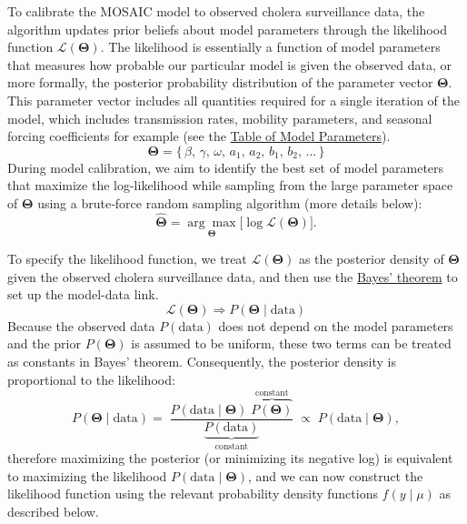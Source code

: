 \documentclass[
]{book}
\begin{document}
To calibrate the MOSAIC model to observed cholera surveillance data, the algorithm updates prior beliefs about model parameters through the likelihood function \(\mathcal{L}(\boldsymbol{\Theta})\). The likelihood is essentially a function of model parameters that measures how probable our particular model is given the observed data, or more formally, the posterior probability distribution of the parameter vector \(\boldsymbol{\Theta}\). This parameter vector includes all quantities required for a single iteration of the model, which includes transmission rates, mobility parameters, and seasonal forcing coefficients for example (see the \href{https://www.mosaicmod.org/model-description.html\#table-of-model-parameters}{Table of Model Parameters}).
\begin{equation}
\boldsymbol{\Theta} = \{\, \beta,\, \gamma,\, \omega,\, a_1,\, a_2,\, b_1,\, b_2,\, \dots \, \}
\label{eq:theta}
\end{equation}
During model calibration, we aim to identify the best set of model parameters that maximize the log-likelihood while sampling from the large parameter space of \(\boldsymbol{\Theta}\) using a brute‑force random sampling algorithm (more details below):
\begin{equation}
\hat{\boldsymbol{\Theta}} = \underset{\boldsymbol{\Theta}}{\arg\max}\big[\log \mathcal{L}(\boldsymbol{\Theta})\big].
\label{eq:general-likelihood}
\end{equation}

To specify the likelihood function, we treat \(\mathcal{L}(\boldsymbol{\Theta})\) as the posterior density of \(\boldsymbol{\Theta}\) given the observed cholera surveillance data, and then use the \href{https://en.wikipedia.org/wiki/Bayes\%27_theorem}{Bayes' theorem} to set up the model-data link.
\begin{equation}
\mathcal{L}(\boldsymbol{\Theta}) \Longrightarrow P(\boldsymbol{\Theta}\mid\text{data})  
\label{eq:bayes-1}
\end{equation}
Because the observed data \(P(\text{data})\) does not depend on the model parameters and the prior \(P(\boldsymbol{\Theta})\) is assumed to be uniform, these two terms can be treated as constants in Bayes' theorem. Consequently, the posterior density is proportional to the likelihood:
\begin{equation}
P(\boldsymbol{\Theta}\mid\text{data})
=\;
\frac{\displaystyle
P(\text{data}\mid\boldsymbol{\Theta})\;
\overbrace{P(\boldsymbol{\Theta})}^{\text{constant}}
}
{\displaystyle
\underbrace{P(\text{data})}_{\text{constant}}
}
\;\propto\;
P(\text{data}\mid\boldsymbol{\Theta}),
\label{eq:bayes-2}
\end{equation}
therefore maximizing the posterior (or minimizing its negative log) is equivalent to maximizing the likelihood \(P(\text{data}\mid\boldsymbol{\Theta})\), and we can now construct the likelihood function using the relevant probability density functions \(f(y\mid\mu)\) as described below.
\end{document}
